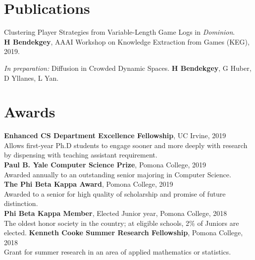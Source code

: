 \documentclass[margin]{res}
\begin{document}
\begin{resume}
\section{Publications}
\par
Clustering Player Strategies from Variable-Length Game Logs in \emph{Dominion}.\\ \textbf{H Bendekgey}, AAAI Workshop on Knowledge Extraction from Games (KEG), 2019.

\emph{In preparation:} Diffusion in Crowded Dynamic Spaces. \textbf{H Bendekgey}, G Huber, D Yllanes, L Yan.

\section{Awards}
\textbf{Enhanced CS Department Excellence Fellowship}, UC Irvine, 2019\\Allows first-year Ph.D students to engage sooner and more deeply with research by dispensing with teaching assistant requirement.\\
\textbf{Paul B. Yale Computer Science Prize}, Pomona College, 2019\\Awarded annually to an outstanding senior majoring in Computer Science.\\
\textbf{The Phi Beta Kappa Award}, Pomona College, 2019\\Awarded to a senior for high quality of scholarship and promise of future distinction.\\
\textbf{Phi Beta Kappa Member}, Elected Junior year, Pomona College, 2018 \\
The oldest honor society in the country; at eligible schools, 2\% of Juniors are elected.
\textbf{Kenneth Cooke Summer Research Fellowship}, Pomona College, 2018\\Grant for summer research in an area of applied mathematics or statistics.\\

\end{resume}
\end{document}

